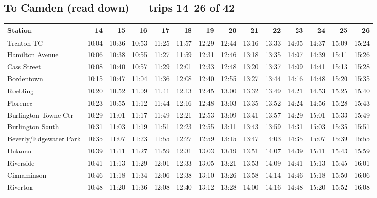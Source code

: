 \subsection*{To Camden (read down) --- trips 14--26 of 42}
\begin{center}\footnotesize\setlength{\tabcolsep}{3pt}\begin{tabular}{@{}lrrrrrrrrrrrrr@{}}\toprule
Station & 14 & 15 & 16 & 17 & 18 & 19 & 20 & 21 & 22 & 23 & 24 & 25 & 26 \\\midrule
Trenton TC & 10:04 & 10:36 & 10:53 & 11:25 & 11:57 & 12:29 & 12:44 & 13:16 & 13:33 & 14:05 & 14:37 & 15:09 & 15:24 \\
Hamilton Avenue & 10:06 & 10:38 & 10:55 & 11:27 & 11:59 & 12:31 & 12:46 & 13:18 & 13:35 & 14:07 & 14:39 & 15:11 & 15:26 \\
Cass Street & 10:08 & 10:40 & 10:57 & 11:29 & 12:01 & 12:33 & 12:48 & 13:20 & 13:37 & 14:09 & 14:41 & 15:13 & 15:28 \\
Bordentown & 10:15 & 10:47 & 11:04 & 11:36 & 12:08 & 12:40 & 12:55 & 13:27 & 13:44 & 14:16 & 14:48 & 15:20 & 15:35 \\
Roebling & 10:20 & 10:52 & 11:09 & 11:41 & 12:13 & 12:45 & 13:00 & 13:32 & 13:49 & 14:21 & 14:53 & 15:25 & 15:40 \\
Florence & 10:23 & 10:55 & 11:12 & 11:44 & 12:16 & 12:48 & 13:03 & 13:35 & 13:52 & 14:24 & 14:56 & 15:28 & 15:43 \\
Burlington Towne Ctr & 10:29 & 11:01 & 11:17 & 11:49 & 12:21 & 12:53 & 13:09 & 13:41 & 13:57 & 14:29 & 15:01 & 15:33 & 15:49 \\
Burlington South & 10:31 & 11:03 & 11:19 & 11:51 & 12:23 & 12:55 & 13:11 & 13:43 & 13:59 & 14:31 & 15:03 & 15:35 & 15:51 \\
Beverly/Edgewater Park & 10:35 & 11:07 & 11:23 & 11:55 & 12:27 & 12:59 & 13:15 & 13:47 & 14:03 & 14:35 & 15:07 & 15:39 & 15:55 \\
Delanco & 10:39 & 11:11 & 11:27 & 11:59 & 12:31 & 13:03 & 13:19 & 13:51 & 14:07 & 14:39 & 15:11 & 15:43 & 15:59 \\
Riverside & 10:41 & 11:13 & 11:29 & 12:01 & 12:33 & 13:05 & 13:21 & 13:53 & 14:09 & 14:41 & 15:13 & 15:45 & 16:01 \\
Cinnaminson & 10:46 & 11:18 & 11:34 & 12:06 & 12:38 & 13:10 & 13:26 & 13:58 & 14:14 & 14:46 & 15:18 & 15:50 & 16:06 \\
Riverton & 10:48 & 11:20 & 11:36 & 12:08 & 12:40 & 13:12 & 13:28 & 14:00 & 14:16 & 14:48 & 15:20 & 15:52 & 16:08 \\

\end{tabular}
\end{center}
